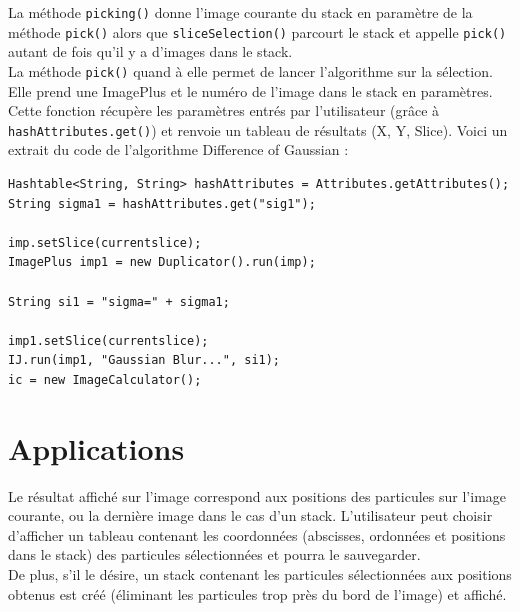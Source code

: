 La méthode \texttt{picking()} donne l'image courante du stack en paramètre de la méthode \texttt{pick()} alors que \texttt{sliceSelection()} parcourt le stack et appelle \texttt{pick()} autant de fois qu'il y a d'images dans le stack. \\

La méthode \texttt{pick()} quand à elle permet de lancer l'algorithme sur la sélection. Elle prend une ImagePlus et le numéro de l'image dans le stack en paramètres. Cette fonction récupère les paramètres entrés par l'utilisateur (grâce à \texttt{hashAttributes.get()}) et renvoie un tableau de résultats (X, Y, Slice). Voici un extrait du code de l'algorithme Difference of Gaussian :


\begin{lstlisting}
Hashtable<String, String> hashAttributes = Attributes.getAttributes();
String sigma1 = hashAttributes.get("sig1");

imp.setSlice(currentslice);
ImagePlus imp1 = new Duplicator().run(imp);

String si1 = "sigma=" + sigma1;

imp1.setSlice(currentslice);
IJ.run(imp1, "Gaussian Blur...", si1);
ic = new ImageCalculator();
\end{lstlisting}








\section{Applications}

Le résultat affiché sur l'image correspond aux positions des particules sur l'image courante, ou la dernière image dans le cas d'un stack.
L'utilisateur peut choisir d'afficher un tableau contenant les coordonnées (abscisses, ordonnées et positions dans le stack) des particules sélectionnées et pourra le sauvegarder. \\
De plus, s'il le désire, un stack contenant les particules sélectionnées aux positions obtenus est créé (éliminant les particules trop près du bord de l'image) et affiché.

